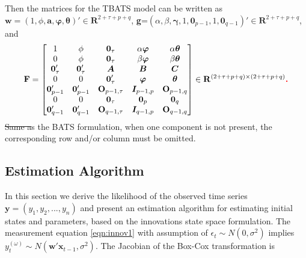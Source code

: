 \documentclass{uwstat572}
\newcommand{\vmdel}[1]{\sout{#1}}
\newcommand{\vmadd}[1]{\textbf{\color{red}{#1}}}
\begin{document}
Then the matrices for the TBATS model can be written as $\textbf{w}=(1,\phi,\textbf{a}, \bm{\varphi}, \bm{\theta})' \in \mathbf{R}^{2+\tau+p+q}$, \textbf{g}=$(\alpha,\beta,\bm{\gamma}, 1, \textbf{0}_{p-1}, 1, \textbf{0}_{q-1})'\in \mathbf{R}^{2+\tau+p+q}$, and 
\[
\mathbf{F}=\begin{bmatrix} 
1 & \phi& \textbf{0}_\tau & \alpha \bm{\varphi} & \alpha \bm{\theta}  \\
0 & \phi& \textbf{0}_\tau & \beta \bm{\varphi} & \beta \bm{\theta}  \\
\textbf{0}'_\tau &  \textbf{0}'_\tau  & \bm{A} & \bm{B} & \bm{C} \\
0 & 0 & \textbf{0}'_\tau & \bm{\varphi} & \bm{\theta}  \\
\bm{0}'_{p-1} & \bm{0}'_{p-1} & \textbf{O}_{p-1,\tau} & \bm{I}_{p-1,p} &\textbf{O}_{p-1,q} \\
0 & 0 &\textbf{0}_\tau & \textbf{0}_p & \textbf{0}_q \\
\bm{0}'_{q-1} & \bm{0}'_{q-1} & \textbf{O}_{q-1,\tau} & \bm{I}_{q-1,p} &\textbf{O}_{q-1,q} \\
\end{bmatrix} \in \mathbf{R}^{(2+\tau+p+q) \times (2+\tau+p+q)}\vmadd{.}
\]
\vmdel{Same a}\vmadd{A}s \vmadd{in} the BATS formulation, when one component is not present, the corresponding row and/or column must be omitted.

\subsection{Estimation Algorithm}
In this section we derive the likelihood of the observed time series $\textbf{y}=(y_1,y_2,...,y_n)$ and present an estimation algorithm for estimating initial states and parameters, based on the innovations state space formulation. 
The measurement equation \ref{eqn:innov1}\vmadd{,} with \vmadd{the} assumption of $\epsilon_t \sim N(0,\sigma^2)$\vmadd{,} implies $y_t^{(\omega)} \sim N(\textbf{w}'\textbf{x}_{t-1},\sigma^2)$. The Jacobian of the Box-Cox transformation is
\end{document}
